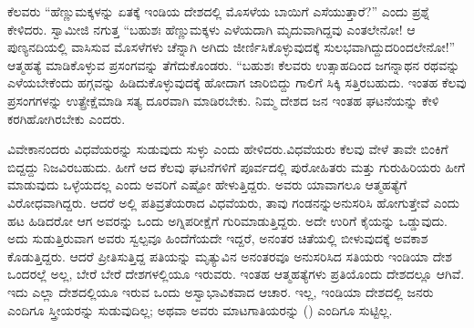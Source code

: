  ಕೆಲವರು “ಹೆಣ್ಣುಮಕ್ಕಳನ್ನು ಏತಕ್ಕೆ ಇಂಡಿಯ ದೇಶದಲ್ಲಿ ಮೊಸಳೆಯ ಬಾಯಿಗೆ ಎಸೆಯುತ್ತಾರೆ?” ಎಂದು ಪ್ರಶ್ನೆ ಕೇಳಿದರು. ಸ್ವಾಮೀಜಿ ನಗುತ್ತ “ಬಹುಶಃ ಹೆಣ್ಣುಮಕ್ಕಳು ಎಳೆಯದಾಗಿ ಮೃದುವಾಗಿದ್ದವು ಎಂತಲೇನೋ! ಆ ಪುಣ್ಯನದಿಯಲ್ಲಿ ವಾಸಿಸುವ ಮೊಸಳೆಗಳು ಚೆನ್ನಾಗಿ ಅಗಿದು ಜೀರ್ಣಿಸಿಕೊಳ್ಳುವುದಕ್ಕೆ ಸುಲಭವಾಗಿದ್ದುದರಿಂದಲೇನೋ!” ಆತ್ಮಹತ್ಯೆ ಮಾಡಿಕೊಳ್ಳುವ ಪ್ರಸಂಗವನ್ನು ತೆಗೆದುಕೊಂಡರು. “ಬಹುಶಃ ಕೆಲವರು ಉತ್ಸಾಹದಿಂದ ಜಗನ್ನಾಥನ ರಥವನ್ನು ಎಳೆಯಬೇಕೆಂದು ಹಗ್ಗವನ್ನು ಹಿಡಿದುಕೊಳ್ಳುವುದಕ್ಕೆ ಹೋದಾಗ ಜಾರಿಬಿದ್ದು ಗಾಲಿಗೆ ಸಿಕ್ಕಿ ಸತ್ತಿರಬಹುದು. ಇಂತಹ ಕೆಲವು ಪ್ರಸಂಗಗಳನ್ನು ಉತ್ಪ್ರೇಕ್ಷೆಮಾಡಿ ಸತ್ಯ ದೂರವಾಗಿ ಮಾಡಿರಬೇಕು. ನಿಮ್ಮ ದೇಶದ ಜನ ಇಂತಹ ಘಟನೆಯನ್ನು ಕೇಳಿ ಕರಗಿಹೋಗಿರಬೇಕು ಎಂದರು. 

 ವಿವೇಕಾನಂದರು ವಿಧವೆಯರನ್ನು ಸುಡುವುದು ಸುಳ್ಳು ಎಂದು ಹೇಳಿದರು.\break ವಿಧವೆಯರು ಕೆಲವು ವೇಳೆ ತಾವೇ ಬಿಂಕಿಗೆ ಬಿದ್ದದ್ದು ನಿಜವಿರಬಹುದು. ಹೀಗೆ ಆದ ಕೆಲವು ಘಟನೆಗಳಿಗೆ ಪೂರ್ವದಲ್ಲಿ ಪುರೋಹಿತರು ಮತ್ತು ಗುರುಹಿರಿಯರು ಹೀಗೆ ಮಾಡುವುದು ಒಳ್ಳೆಯದಲ್ಲ ಎಂದು ಅವರಿಗೆ ಎಷ್ಟೋ ಹೇಳುತ್ತಿದ್ದರು. ಅವರು ಯಾವಾಗಲೂ ಆತ್ಮಹತ್ಯೆಗೆ ವಿರೋಧವಾಗಿದ್ದರು. ಆದರೆ ಅಲ್ಲಿ ಪತಿವ್ರತೆಯರಾದ ವಿಧವೆಯರು, ತಾವು ಗಂಡನನ್ನು\break ಅನುಸರಿಸಿ ಹೋಗುತ್ತೇವೆ ಎಂದು ಹಟ ಹಿಡಿದರೋ ಆಗ ಅವರನ್ನು ಒಂದು ಅಗ್ನಿಪರೀಕ್ಷೆಗೆ ಗುರಿಮಾಡುತ್ತಿದ್ದರು. ಅದೇ ಉರಿಗೆ ಕೈಯನ್ನು ಒಡ್ಡುವುದು. ಅದು ಸುಡುತ್ತಿರುವಾಗ ಅವರು ಸ್ವಲ್ಪವೂ ಹಿಂದೆಗೆಯದೇ ಇದ್ದರೆ, ಅನಂತರ ಚಿತೆಯಲ್ಲಿ ಬೀಳುವುದಕ್ಕೆ ಅವಕಾಶ ಕೊಡುತ್ತಿದ್ದರು. ಆದರೆ ಪ್ರೀತಿಸುತ್ತಿದ್ದ ಪತಿಯನ್ನು ಮೃತ್ಯುವಿನ ಅನಂತರವೂ ಅನುಸರಿಸಿದ ಸತಿಯರು ಇಂಡಿಯಾ ದೇಶ ಒಂದರಲ್ಲೆ ಅಲ್ಲ, ಬೇರೆ ಬೇರೆ ದೇಶಗಳಲ್ಲಿಯೂ ಇರುವರು. ಇಂತಹ ಆತ್ಮಹತ್ಯೆಗಳು ಪ್ರತಿಯೊಂದು ದೇಶದಲ್ಲೂ ಆಗಿವೆ. ಇದು ಎಲ್ಲಾ ದೇಶದಲ್ಲಿಯೂ ಇರುವ ಒಂದು ಅಸ್ವಾಭಾವಿಕವಾದ ಆಚಾರ. ಇಲ್ಲ, ಇಂಡಿಯಾ ದೇಶದಲ್ಲಿ ಜನರು ಎಂದಿಗೂ ಸ್ತ್ರೀಯರನ್ನು ಸುಡುವುದಿಲ್ಲ; ಅಥವಾ ಅವರು ಮಾಟಗಾತಿಯರನ್ನು () ಎಂದಿಗೂ ಸುಟ್ಟಿಲ್ಲ. 

